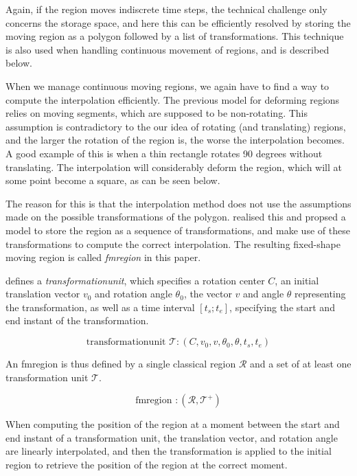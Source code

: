 Again, if the region moves indiscrete time steps, the technical challenge only concerns the storage space, and here this can be efficiently resolved by storing the moving region as a polygon followed by a list of transformations. This technique is also used when handling continuous movement of regions, and is described below.

When we manage continuous moving regions, we again have to find a way to compute the interpolation efficiently. The previous model for deforming regions relies on moving segments, which are supposed to be non-rotating. This assumption is contradictory to the our idea of rotating (and translating) regions, and the larger the rotation of the region is, the worse the interpolation becomes. A good example of this is when a thin rectangle rotates 90 degrees without translating. The interpolation will considerably deform the region, which will at some point become a square, as can be seen below.


The reason for this is that the interpolation method does not use the assumptions made on the possible transformations of the polygon.  realised this and propsed a model to store the region as a sequence of transformations, and make use of these transformations to compute the correct interpolation. The resulting fixed-shape moving region is called \textit{fmregion} in this paper.

 defines a \textit{transformationunit}, which specifies a rotation center $C$, an initial translation vector $v_0$ and rotation angle $\theta_0$, the vector $v$ and angle $\theta$ representing the transformation, as well as a time interval $[t_s; t_e]$, specifying the start and end instant of the transformation.

\begin{equation}
    \text{transformationunit } \mathcal{T}: (C, v_0, v, \theta_0, \theta, t_{s}, t_{e})
\end{equation}

An fmregion is thus defined by a single classical region $\mathcal{R}$ and a set of at least one transformation unit $\mathcal{T}$.

\begin{equation}
    \text{fmregion } : (\mathcal{R}, \mathcal{T}^{+})
\end{equation}

When computing the position of the region at a moment between the start and end instant of a transformation unit, the translation vector, and rotation angle are linearly interpolated, and then the transformation is applied to the initial region to retrieve the position of the region at the correct moment.

